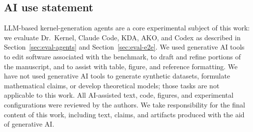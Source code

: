 \subsection*{AI use statement}

LLM-based kernel-generation agents are a core experimental subject of this work: we evaluate Dr.~Kernel, Claude Code, KDA, AKO, and Codex as described in Section~\ref{sec:eval-agents} and Section~\ref{sec:eval-e2e}.
We used generative AI tools to edit software associated with the benchmark, to draft and refine portions of the manuscript, and to assist with table, figure, and reference formatting.
We have not used generative AI tools to generate synthetic datasets, formulate mathematical claims, or develop theoretical models; those tasks are not applicable to this work.
All AI-assisted text, code, figures, and experimental configurations were reviewed by the authors.
We take responsibility for the final content of this work, including text, claims, and artifacts produced with the aid of generative AI.
